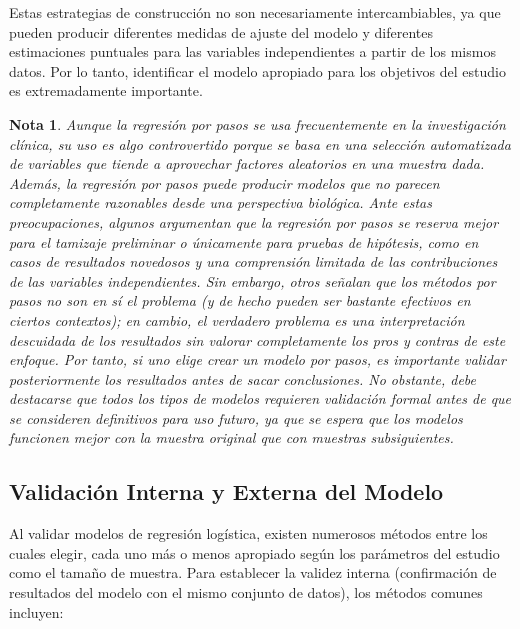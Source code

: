 \documentclass[12pt]{article}
\newtheorem{Note}{Nota}%
\begin{document}
Estas estrategias de construcci\'on no son necesariamente intercambiables, ya que pueden producir diferentes medidas de ajuste del modelo y diferentes estimaciones puntuales para las variables independientes a partir de los mismos datos. Por lo tanto, identificar el modelo apropiado para los objetivos del estudio es extremadamente importante.

\begin{Note}
Aunque la regresi\'on por pasos se usa frecuentemente en la investigaci\'on cl\'inica, su uso es algo controvertido porque se basa en una selecci\'on automatizada de variables que tiende a aprovechar factores aleatorios en una muestra dada.  Adem\'as, la regresi\'on por pasos puede producir modelos que no parecen completamente razonables desde una perspectiva biol\'ogica. Ante estas preocupaciones, algunos argumentan que la regresi\'on por pasos se reserva mejor para el tamizaje preliminar o \'unicamente para pruebas de hip\'otesis, como en casos de resultados novedosos y una comprensi\'on limitada de las contribuciones de las variables independientes. Sin embargo, otros se\~nalan que los m\'etodos por pasos no son en s\'i el problema (y de hecho pueden ser bastante efectivos en ciertos contextos); en cambio, el verdadero problema es una interpretaci\'on descuidada de los resultados sin valorar completamente los pros y contras de este enfoque. Por tanto, si uno elige crear un modelo por pasos, es importante validar posteriormente los resultados antes de sacar conclusiones. No obstante, debe destacarse que todos los tipos de modelos requieren validaci\'on formal antes de que se consideren definitivos para uso futuro, ya que se espera que los modelos funcionen mejor con la muestra original que con muestras subsiguientes.\cite{darlington1990, tabachnick2007, hosmer2000}
\end{Note}

\subsection{Validaci\'on Interna y Externa del Modelo}
Al validar modelos de regresi\'on log\'istica, existen numerosos m\'etodos entre los cuales elegir, cada uno m\'as o menos apropiado seg\'un los par\'ametros del estudio como el tama\~no de muestra. Para establecer la validez interna (confirmaci\'on de resultados del modelo con el mismo conjunto de datos), los m\'etodos comunes incluyen: 
\end{document}
